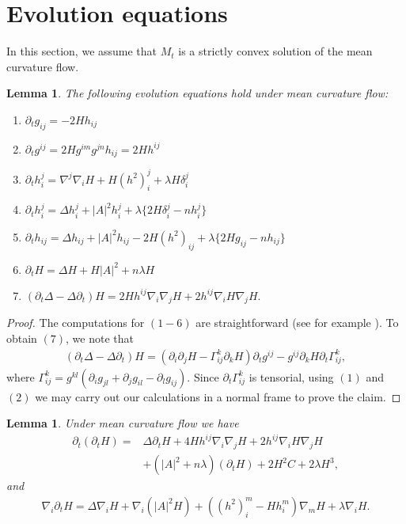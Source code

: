\documentclass{amsart}
\newtheorem{lemma}[theorem]{Lemma}
\theoremstyle{definition}
\theoremstyle{remark}
\numberwithin{equation}{section}
\begin{document}
\section{Evolution equations}
In this section, we assume that $M_t$ is a strictly convex solution of the mean curvature flow.
\begin{lemma}\label{lem: lem3}
The following evolution equations hold under mean curvature flow:
\begin{enumerate}
  \item $\partial_tg_{ij}=-2Hh_{ij}$
  \item $\partial_tg^{ij}=2Hg^{im}g^{jn}h_{ij}=2Hh^{ij}$
  \item $\partial_t h_i^j=\nabla^j\nabla_iH+H(h^2)_i^j+\lambda H\delta_i^j$
  \item $\partial_t h_i^j=\Delta h_i^j+|A|^2h_i^j+\lambda \{2H\delta_i^j-nh_i^j\}$
  \item $\partial_t h_{ij}=\Delta h_{ij}+|A|^2h_{ij}-2H(h^2)_{ij}+\lambda \{2Hg_{ij}-nh_{ij}\}$
  \item $\partial_t H=\Delta H+H|A|^2+n\lambda H$
  \item $(\partial_t\Delta-\Delta\partial_t)H=2Hh^{ij}\nabla_i\nabla_jH+2h^{ij}\nabla_iH\nabla_jH.$
\end{enumerate}
\end{lemma}
\begin{proof} The computations for $(1-6)$ are straightforward (see for example \cite{Huisken 87}). To obtain $(7)$, we note that
\begin{align*}
(\partial_t\Delta-\Delta\partial_t)H=\left(\partial_i\partial_jH-\Gamma_{ij}^k\partial_kH\right)\partial_tg^{ij}-g^{ij}\partial_kH\partial_t\Gamma_{ij}^k,
\end{align*}
where $\Gamma_{ij}^k=g^{kl}(\partial_ig_{jl}+\partial_jg_{il}-\partial_lg_{ij}).$ Since $\partial_t\Gamma_{ij}^k$ is tensorial, using $(1)$ and $ (2)$ we may carry out our calculations in a normal frame to prove the claim.
\end{proof}
\begin{lemma}\label{lem: lem1}
Under mean curvature flow we have
\begin{align*}
\partial_t(\partial_tH)=&
\Delta \partial_tH+4Hh^{ij}\nabla_i\nabla_jH+2h^{ij}\nabla_iH\nabla_jH\\
&+(|A|^2+n\lambda )(\partial_t H)+2H^2C+2\lambda H^3,
\end{align*}
and
\begin{align*}
\nabla_i\partial_tH
=\Delta\nabla_iH+\nabla_i(|A|^2H)+((h^2)_i^m-Hh_i^m)\nabla_mH+\lambda \nabla_iH.
\end{align*}
\end{lemma}
\end{document}
